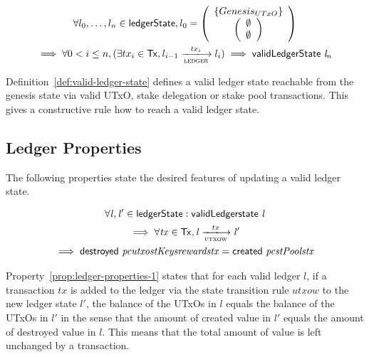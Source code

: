 \begin{definition}
  \begin{multline*}
    \label{eq:2}
    \forall l_{0},\ldots,l_{n} \in \ledgerState, l_{0} =
    \left(
      \begin{array}{c}
        \left\{
        \genesisUTxO
        \right\} \\
        \left(
        \begin{array}{c}
          \emptyset\\
          \emptyset
        \end{array}
        \right)
      \end{array}
    \right)  \\
    \implies \forall 0 < i \leq n, (\exists tx_{i} \in \Tx, l_{i-1}
    \trans{ledger}{tx_{i}} l_{i}) \implies \applyFun{validLedgerState} l_{n}
  \end{multline*}
  \label{def:valid-ledger-state}
\end{definition}

Definition~\ref{def:valid-ledger-state} defines a valid ledger state reachable
from the genesis state via valid UTxO, stake delegation or stake pool
transactions. This gives a constructive rule how to reach a valid ledger state.

\subsection{Ledger Properties}
\label{sec:ledger-properties}

The following properties state the desired features of updating a valid ledger
state.

\begin{property}
  \begin{multline*}
    \forall \var{l}, \var{l'} \in \ledgerState: \applyFun{validLedgerstate}{l}\\
    \implies \forall \var{tx} \in \Tx, \var{l} \trans{utxow}{tx} \var{l'} \\
    \implies \applyFun{destroyed}{pc utxo stKeys rewards tx} =
    \applyFun{created}{pc stPools tx}
  \end{multline*}
  \label{prop:ledger-properties-1}
\end{property}

Property~\ref{prop:ledger-properties-1} states that for each valid ledger $l$,
if a transaction $tx$ is added to the ledger via the state transition rule
$utxow$ to the new ledger state $l'$, the balance of the UTxOs in $l$ equals the
balance of the UTxOs in $l'$ in the sense that the amount of created value in
$l'$ equals the amount of destroyed value in $l$. This means that the total
amount of value is left unchanged by a transaction.

